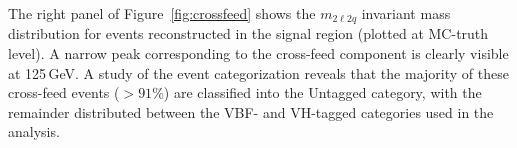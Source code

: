 
The right panel of Figure~\ref{fig:crossfeed} shows the $m_{2\ell2q}$ invariant mass distribution for events reconstructed in the \offshell signal region (plotted at MC-truth level). A narrow peak corresponding to the \onshell cross-feed component is clearly visible at 125\,GeV. A study of the event categorization reveals that the majority of these cross-feed events (\(>91\%\)) are classified into the Untagged category, with the remainder distributed between the VBF- and VH-tagged categories used in the analysis.
